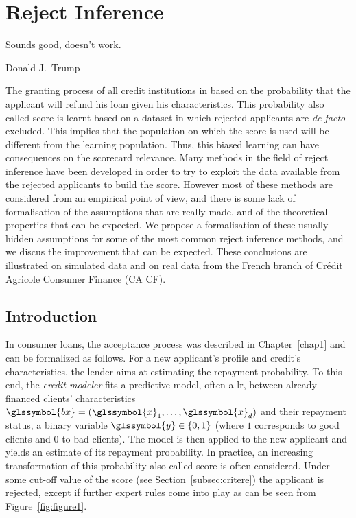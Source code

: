
\chapter{Reject Inference} \label{chap2}

\epigraph{Sounds good, doesn't work.}{Donald J.\ Trump}

\minitoc


\bigskip

The granting process of all credit institutions in based on the probability that the applicant will refund his loan given his characteristics. This probability also called \gls{score} is learnt based on a dataset in which rejected applicants are \textit{de facto} excluded. This implies that the population on which the score is used will be different from the learning population. Thus, this biased learning can have consequences on the scorecard relevance. Many methods in the field of reject inference have been developed in order to try to exploit the data available from the rejected applicants to build the score. However most of these methods are considered from an empirical point of view, and there is some lack of formalisation of the assumptions that are really made, and of the theoretical properties that can be expected. We propose a formalisation of these usually hidden assumptions for some of the most common reject inference methods, and we discus the improvement that can be expected. These conclusions are illustrated on simulated data and on real data from the French branch of Crédit Agricole Consumer Finance (CA CF).


\section{Introduction}


In consumer loans, the acceptance process was described in Chapter~\ref{chap1} and can be formalized as follows. For a new applicant's profile and credit's characteristics, the lender aims at estimating the repayment probability. To this end, the \textit{credit modeler} fits a predictive model, often a \gls{lr}, between already  financed  clients' characteristics $\glssymbol{bx}=(\glssymbol{x}_1,\ldots,\glssymbol{x}_d)$ and their repayment status, a binary variable $\glssymbol{y}\in\{0,1\}$ (where $1$ corresponds to good clients and $0$ to bad clients). The model is then applied to the new applicant and yields an estimate of its repayment probability. In practice, an increasing transformation of this probability also called score is often considered.
Under some cut-off value of the \gls{score} (see Section~\ref{subsec:critere}) the applicant is rejected, except if further expert rules come into play as can be seen from Figure~\ref{fig:figure1}.

